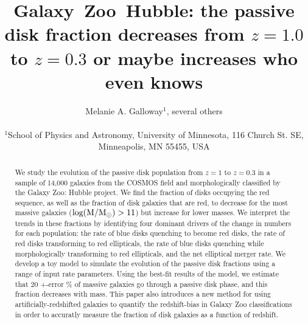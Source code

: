 \documentclass[useAMS,usenatbib]{mn2e}
\begin{document}
\title[Galaxy~Zoo: passive disk fraction]{Galaxy~Zoo~Hubble: the passive disk fraction decreases from $z=1.0$ to $z=0.3$ or maybe increases who even knows}
\author[Galloway et~al.]{\parbox[t]{16cm}{Melanie A. Galloway$^1$, several others
\vspace{0.1in} }\\
$^{1}$School of Physics and Astronomy, University of Minnesota, 116 Church St. SE, Minneapolis, MN 55455, USA\\
   }
\maketitle

\begin{abstract}
We study the evolution of the passive disk population from $z=1$ to $z=0.3$ in a sample of 14,000 galaxies from the COSMOS field and morphologically classified by the Galaxy Zoo: Hubble project. We find the fraction of disks occupying the red sequence, as well as the fraction of disk galaxies that are red, to decrease for the most massive galaxies ($\rm log(M/M_{\odot})>11$) but increase for lower masses. We interpret the trends in these fractions by identifying four dominant drivers of the change in numbers for each population: the rate of blue disks quenching to become red disks, the rate of red disks transforming to red ellipticals, the rate of blue disks quenching while morphologically transforming to red ellipticals, and the net elliptical merger rate. We develop a toy model to simulate the evolution of the passive disk fractions using a range of input rate parameters. Using the best-fit results of the model, we estimate that 20 +-error \% of massive galaxies go through a passive disk phase, and this fraction decreases with mass. This paper also introduces a new method for using artificially-redshifted galaxies to quantify the redshift-bias in Galaxy Zoo classifications in order to accuratly measure the fraction of disk galaxies as a function of redshift.  

\end{abstract}
\end{document}
